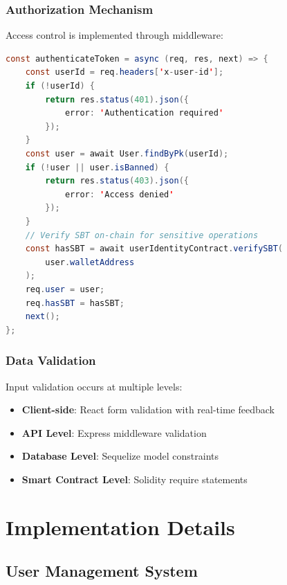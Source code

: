 \documentclass[12pt]{report}
\theoremstyle{plain}
\theoremstyle{definition}
\theoremstyle{remark}
\begin{document}
\subsection{Authorization Mechanism}

Access control is implemented through middleware:

\begin{lstlisting}[language=Java, caption=Authentication Middleware]
const authenticateToken = async (req, res, next) => {
    const userId = req.headers['x-user-id'];
    if (!userId) {
        return res.status(401).json({
            error: 'Authentication required'
        });
    }
    const user = await User.findByPk(userId);
    if (!user || user.isBanned) {
        return res.status(403).json({
            error: 'Access denied'
        });
    }
    // Verify SBT on-chain for sensitive operations
    const hasSBT = await userIdentityContract.verifySBT(
        user.walletAddress
    );
    req.user = user;
    req.hasSBT = hasSBT;
    next();
};
\end{lstlisting}

\subsection{Data Validation}

Input validation occurs at multiple levels:

\begin{itemize}
    \item \textbf{Client-side}: React form validation with real-time feedback
    \item \textbf{API Level}: Express middleware validation
    \item \textbf{Database Level}: Sequelize model constraints
    \item \textbf{Smart Contract Level}: Solidity require statements
\end{itemize}

\chapter{Implementation Details}

\section{User Management System}
\end{document}
